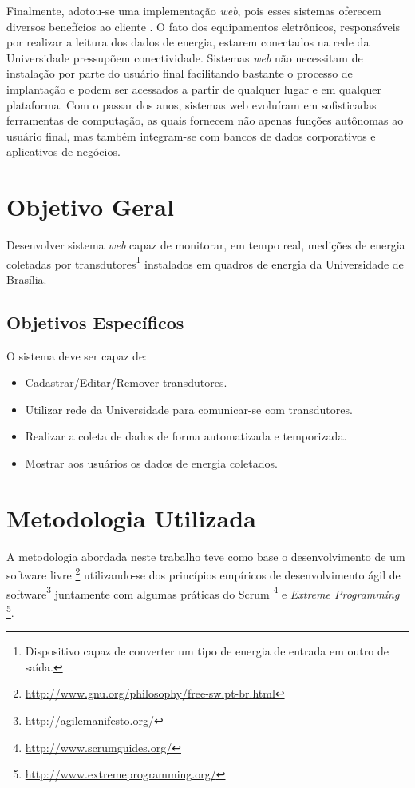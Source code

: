 Finalmente, adotou-se uma implementação \textit{web}, pois esses sistemas oferecem diversos benefícios ao cliente \cite{pressman_2009}. O fato dos equipamentos eletrônicos, responsáveis por realizar a leitura dos dados de energia, estarem conectados na rede da Universidade pressupõem conectividade. Sistemas \textit{web} não necessitam de instalação por parte do usuário final facilitando bastante o processo de implantação e podem ser acessados a partir de qualquer lugar e em qualquer plataforma. Com o passar dos anos, sistemas web evoluíram em sofisticadas ferramentas de computação, as quais fornecem não apenas funções autônomas ao usuário final, mas também integram-se com bancos de dados corporativos e aplicativos de negócios.

\section{Objetivo Geral}
Desenvolver sistema \textit{web} capaz de monitorar, em tempo real, medições de energia coletadas por transdutores\footnote{Dispositivo capaz de converter um tipo de energia de entrada em outro de saída.}
instalados em quadros de energia da Universidade de Brasília.

\subsection{Objetivos Específicos}
O sistema deve ser capaz de:
\begin{itemize}
    \item Cadastrar/Editar/Remover transdutores.
    \item Utilizar rede da Universidade para comunicar-se com transdutores.
    \item Realizar a coleta de dados de forma automatizada e temporizada.
    \item Mostrar aos usuários os dados de energia coletados.
\end{itemize}

\section{Metodologia Utilizada}
A metodologia abordada neste trabalho teve como base o desenvolvimento de um software livre \footnote{\url{http://www.gnu.org/philosophy/free-sw.pt-br.html}} utilizando-se dos princípios empíricos de desenvolvimento ágil de software\footnote{\url{http://agilemanifesto.org/}} juntamente com algumas práticas do Scrum \footnote{\url{http://www.scrumguides.org/}} e \textit{Extreme Programming} \footnote{\url{http://www.extremeprogramming.org/}}.

